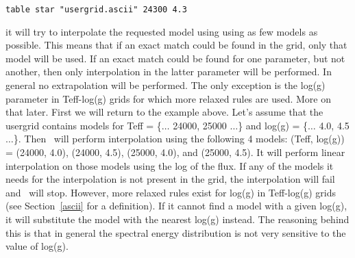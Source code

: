 \begin{verbatim}
table star "usergrid.ascii" 24300 4.3
\end{verbatim}

\noindent
it will try to interpolate the requested model using using as few models as
possible. This means that if an exact match could be found in the grid, only
that model will be used. If an exact match could be found for one parameter,
but not another, then only interpolation in the latter parameter will be
performed. In general no extrapolation will be performed. The only exception
is the log(g) parameter in Teff-log(g) grids for which more relaxed rules are
used. More on that later. First we will return to the example above. Let's
assume that the usergrid contains models for Teff = \{$\ldots$ 24000, 25000
$\ldots$\} and log(g) = \{$\ldots$ 4.0, 4.5 $\ldots$\}. Then \Cloudy\ will
perform interpolation using the following 4 models: (Teff, log(g)) = (24000,
4.0), (24000, 4.5), (25000, 4.0), and (25000, 4.5). It will perform linear
interpolation on those models using the log of the flux. If any of the models
it needs for the interpolation is not present in the grid, the interpolation
will fail and \Cloudy\ will stop. However, more relaxed rules exist for log(g)
in Teff-log(g) grids (see Section~\ref{ascii} for a definition). If it cannot
find a model with a given log(g), it will substitute the model with the
nearest log(g) instead. The reasoning behind this is that in general the
spectral energy distribution is not very sensitive to the value of log(g).

